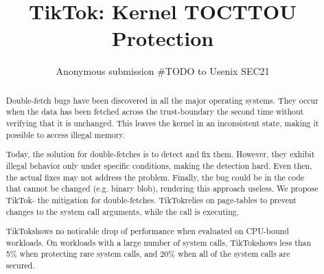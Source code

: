 \usepackage{listings}
\usepackage{parcolumns}
\usepackage{graphicx}
\usepackage{caption}
\usepackage{subcaption}
\usepackage{cleveref}
\usepackage{hyperref}

\newcommand{\pra}[1]{\textcolor{blue}{\textbf{PS:} #1}}
\newcommand{\nb}[1]{\textcolor{green}{\textbf{NB}: #1}}
\newcommand{\mat}[1]{\textcolor{red}{\textbf{Mat:} #1}}
\newcommand{\evalfull}[1]{20}
\newcommand{\evalnocalls}[1]{3}
\newcommand{\sysname}{TikTok}




\date{}

\title{\Large \bf TikTok: Kernel TOCTTOU Protection}

\author{
Anonymous submission \#TODO to Usenix SEC21
} %

\maketitle

\begin{abstract}

Double-fetch bugs have been discovered in all the major operating systems.
They occur when the data has been fetched across the trust-boundary the second
time without verifying that it is unchanged. This leaves the kernel in an
inconsistent state, making it possible to access illegal memory.

Today, the solution for double-fetches is to detect and fix them. However, they
exhibit illegal behavior only under specific conditions, making the detection
hard. Even then, the actual fixes may not address the problem. Finally, the bug
could be in the code that cannot be changed (e.g. binary blob), rendering this
approach useless. We propose \sysname - the mitigation for double-fetches.
\sysname relies on page-tables to prevent changes to the system call arguments,
while the call is executing.

\sysname shows no noticable drop of performance when evaluated on CPU-bound
workloads. On workloads with a large number of system calls, \sysname shows less
than 5\% when protecting rare system calls, and 20\% when all of the system
calls are secured.


\end{abstract}

